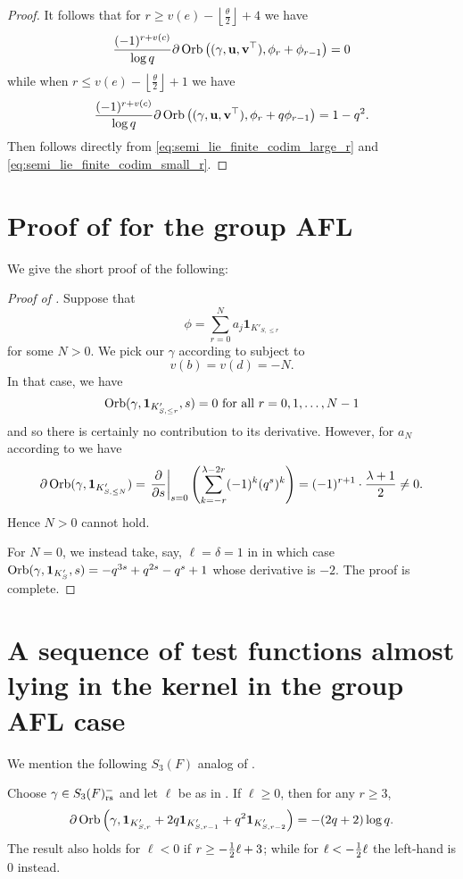 \begin{proof}
  It follows that for $r \ge v(e) - \left\lfloor \frac{\theta}{2} \right\rfloor + 4$ we have
  \begin{equation}
    \frac{(-1)^{r+v(c)}}{\log q}
    \partial \operatorname{Orb} \left( {(\gamma, \mathbf u, \mathbf v^\top)}, \phi_r + \phi_{r-1} \right) = 0
    \label{eq:semi_lie_finite_codim_large_r}
  \end{equation}
  while when $r \le v(e) - \left\lfloor \frac{\theta}{2} \right\rfloor + 1$ we have
  \begin{equation}
    \frac{(-1)^{r+v(c)}}{\log q}
    \partial \operatorname{Orb} \left( {(\gamma, \mathbf u, \mathbf v^\top)}, \phi_r + q\phi_{r-1} \right)
    = 1-q^2.
    \label{eq:semi_lie_finite_codim_small_r}
  \end{equation}
  Then  follows directly
  from \eqref{eq:semi_lie_finite_codim_large_r} and \eqref{eq:semi_lie_finite_codim_small_r}.
\end{proof}
\section{Proof of  for the group AFL}
We give the short proof of the following:
\nogroupkernel*

\begin{proof}[Proof of ]
  Suppose that
  \[ \phi = \sum_{r=0}^N a_j \mathbf{1}_{K'_{S, \le r}} \]
  for some $N > 0$.
  We pick our $\gamma$ according to  subject to
  \[ v(b) = v(d) = -N. \]
  In that case, we have
  \[ \operatorname{Orb}(\gamma, \mathbf{1}_{K'_{S, \le r}}, s) = 0 \text{ for all } r = 0, 1, \dots, N-1 \]
  and so there is certainly no contribution to its derivative.
  However, for $a_N$ according to  we have
  \[
    \partial \operatorname{Orb}(\gamma, \mathbf{1}_{K'_{S, \le N}})
    = \left. \pdv{}{s} \right\rvert_{s=0}
    \left( \sum_{k=-r}^{\lambda-2r} (-1)^k (q^s)^k \right)
    = (-1)^{r+1} \cdot \frac{\lambda+1}{2} \neq 0.
  \]
  Hence $N > 0$ cannot hold.

  For $N=0$, we instead take, say, $\ell = \delta = 1$ in 
  in which case $\operatorname{Orb}(\gamma, \mathbf{1}_{K'_S}, s) = -q^{3s} + q^{2s} - q^s + 1$
  whose derivative is $-2$.
  The proof is complete.
\end{proof}

\section{A sequence of test functions almost lying in the kernel in the group AFL case}
We mention the following $S_3(F)$ analog of .
\begin{theorem}
  [A sequence in $\HH(S_3(F))$]
  \label{thm:group_kernel_full}
  Choose $\gamma \in S_3(F)_{\mathrm{rs}}^-$ and let $\ell$ be as in .
  If $\ell \ge 0$, then for any $r \ge 3$,
  \[ \partial \operatorname{Orb}\left(\gamma, \mathbf{1}_{K'_{S, r}} + 2q \mathbf{1}_{K'_{S, r-1}}
    + q^2 \mathbf{1}_{K'_{S, r-2}}\right) = -(2q+2) \log q. \]
  The result also holds for $\ell < 0$ if $r \ge -\frac{1}{2}\ell + 3$;
  while for $\ell < -\frac{1}{2}\ell$ the left-hand is $0$ instead.
\end{theorem}

